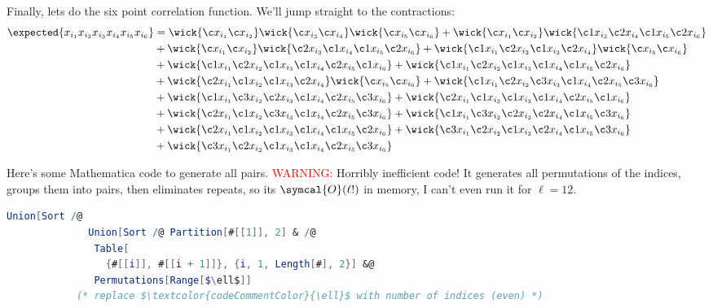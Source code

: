 \documentclass[fleqn]{NotesClass}
\newcommand{\order}{\symcal{O}}
\begin{document}
    Finally, lets do the six point correlation function.
    We'll jump straight to the contractions:
    \begin{align}
        \expected{x_{i_1}x_{i_2}x_{i_3}x_{i_4}x_{i_5}x_{i_6}} &=
        \wick{\c x_{i_1} \c x_{i_2}} \wick{\c x_{i_3} \c x_{i_4}} \wick{\c x_{i_5} \c x_{i_6}}
        + \wick{\c x_{i_1} \c x_{i_2}} \wick{\c1 x_{i_3} \c2 x_{i_4} \c1 x_{i_5} \c2 x_{i_6}}\\
        &+ \wick{\c x_{i_1} \c x_{i_2}} \wick{\c2 x_{i_3} \c1 x_{i_4} \c1 x_{i_5} \c2 x_{i_6}}
        + \wick{\c1 x_{i_1} \c2 x_{i_2} \c1 x_{i_3} \c2 x_{i_4}} \wick{\c x_{i_5} \c x_{i_6}}\\
        &+ \wick{\c1 x_{i_1} \c2 x_{i_2} \c1 x_{i_3} \c1 x_{i_4} \c2 x_{i_5} \c1 x_{i_6}}
        + \wick{\c1 x_{i_1} \c2 x_{i_2} \c1 x_{i_3} \c1 x_{i_4} \c1 x_{i_5} \c2 x_{i_6}}\\
        &+ \wick{\c2 x_{i_1} \c1 x_{i_2} \c1 x_{i_3} \c2 x_{i_4}} \wick{\c x_{i_5} \c x_{i_6}}
        + \wick{\c1 x_{i_1} \c2 x_{i_2} \c3 x_{i_3} \c1 x_{i_4} \c2 x_{i_5} \c3 x_{i_6}}\\
        &+ \wick{\c1 x_{i_1} \c3 x_{i_2} \c2 x_{i_3} \c1 x_{i_4} \c2 x_{i_5} \c3 x_{i_6}}
        + \wick{\c2 x_{i_1} \c1 x_{i_2} \c1 x_{i_3} \c1 x_{i_4} \c2 x_{i_5} \c1 x_{i_6}}\\
        &+ \wick{\c2 x_{i_1} \c1 x_{i_2} \c3 x_{i_3} \c1 x_{i_4} \c2 x_{i_5} \c3 x_{i_6}}
        + \wick{\c1 x_{i_1} \c3 x_{i_2} \c2 x_{i_3} \c2 x_{i_4} \c1 x_{i_5} \c3 x_{i_6}}\\
        &+ \wick{\c2 x_{i_1} \c1 x_{i_2} \c1 x_{i_3} \c1 x_{i_4} \c1 x_{i_5} \c2 x_{i_6}}
        + \wick{\c3 x_{i_1} \c2 x_{i_2} \c1 x_{i_3} \c2 x_{i_4} \c1 x_{i_5} \c3 x_{i_6}}\\
        &+ \wick{\c3 x_{i_1} \c2 x_{i_2} \c1 x_{i_3} \c1 x_{i_4} \c2 x_{i_5} \c3 x_{i_6}}
    \end{align}
    
    \begin{cde}{}{}
        Here's some Mathematica code to generate all pairs.
        \textcolor{Red}{WARNING:} Horribly inefficient code!
        It generates all permutations of the indices, groups them into pairs, then eliminates repeats, so its \(\order(\ell!)\) in memory, I can't even run it for \(\ell = 12\).
        \begin{lstlisting}[gobble=12, language=mathematica, mathescape]
            Union[Sort /@ 
              Union[Sort /@ Partition[#[[1]], 2] & /@ 
               Table[
                 {#[[i]], #[[i + 1]]}, {i, 1, Length[#], 2}] &@
               Permutations[Range[$\ell$]]
            (* replace $\textcolor{codeCommentColor}{\ell}$ with number of indices (even) *)
        \end{lstlisting}
    \end{cde}
    
\end{document}
